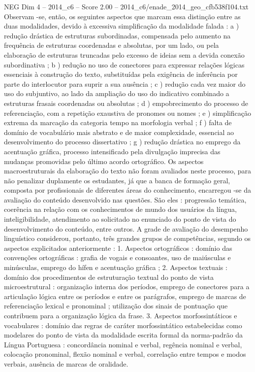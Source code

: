 \begin{textsample}{NEG Dim 4 – 2014\_c6 – Score 2.00 – 2014\_c6/enade\_2014\_geo\_cfb538f104.txt}
Observam -se, então, os seguintes aspectos que marcam essa distinção entre as duas modalidades, devido à excessiva simplificação da modalidade falada : a ) redução drástica de estruturas subordinadas, compensada pelo aumento na frequência de estruturas coordenadas e absolutas, por um lado, ou pela elaboração de estruturas truncadas pelo excesso de ideias sem a devida conexão subordinativa ; b ) redução no uso de conectores para expressar relações lógicas essenciais à construção do texto, substituídas pela exigência de inferência por parte do interlocutor para suprir a sua ausência ; c ) redução cada vez maior do uso do subjuntivo, ao lado da ampliação do uso do indicativo combinado a estruturas frasais coordenadas ou absolutas ; d ) empobrecimento do processo de referenciação, com a repetição exaustiva de pronomes ou nomes ; e ) simplificação extrema da marcação da categoria tempo na morfologia verbal ; f ) falta de domínio de vocabulário mais abstrato e de maior complexidade, essencial ao desenvolvimento do processo dissertativo ; g ) redução drástica no emprego da acentuação gráfica, processo intensificado pela divulgação imprecisa das mudanças promovidas pelo último acordo ortográfico.
Os aspectos macroestruturais da elaboração do texto não foram avaliados neste processo, para não penalizar duplamente os estudantes, já que a banca de formação geral, composta por profissionais de diferentes áreas do conhecimento, encarregou -se da avaliação do conteúdo desenvolvido nas questões.
São eles : progressão temática, coerência na relação com os conhecimentos de mundo dos usuários da língua, inteligibilidade, atendimento ao solicitado no enunciado do ponto de vista do desenvolvimento do conteúdo, entre outros.
A grade de avaliação do desempenho linguístico considerou, portanto, três grandes grupos de competências, segundo os aspectos explicitados anteriormente : 1.
Aspectos ortográficos : domínio das convenções ortográficas : grafia de vogais e consoantes, uso de maiúsculas e minúsculas, emprego do hífen e acentuação gráfica ; 2.
Aspectos textuais : domínio dos procedimentos de estruturação textual do ponto de vista microestrutural : organização interna dos períodos, emprego de conectores para a articulação lógica entre os períodos e entre os parágrafos, emprego de marcas de referenciação lexical e pronominal ; utilização dos sinais de pontuação que contribuem para a organização lógica da frase. 3.
Aspectos morfossintáticos e vocabulares : domínio das regras de caráter morfossintático estabelecidas como modelares do ponto de vista da modalidade escrita formal da norma-padrão da Língua Portuguesa : concordância nominal e verbal, regência nominal e verbal, colocação pronominal, flexão nominal e verbal, correlação entre tempos e modos verbais, ausência de marcas de oralidade.

\end{textsample}
